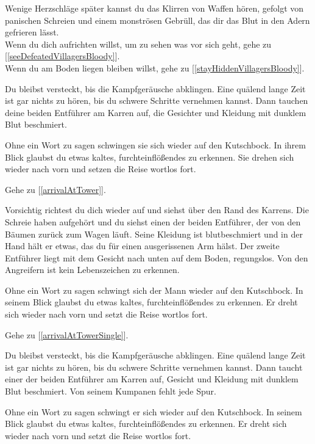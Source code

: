 Wenige Herzschläge später kannst du das Klirren von Waffen hören, gefolgt von panischen Schreien und einem monströsen Gebrüll, das dir das Blut in den Adern gefrieren lässt.
\\Wenn du dich aufrichten willst, um zu sehen was vor sich geht, gehe zu [\ref{seeDefeatedVillagersBloody}].
\\Wenn du am Boden liegen bleiben willst, gehe zu [\ref{stayHiddenVillagersBloody}].


Du bleibst versteckt, bis die Kampfgeräusche abklingen. Eine quälend lange Zeit ist gar nichts zu hören, bis du schwere Schritte vernehmen kannst. Dann tauchen deine beiden Entführer am Karren auf, die Gesichter und Kleidung mit dunklem Blut beschmiert.

Ohne ein Wort zu sagen schwingen sie sich wieder auf den Kutschbock. In ihrem Blick glaubst du etwas kaltes, furchteinflößendes zu erkennen. Sie drehen sich wieder nach vorn und setzen die Reise wortlos fort.

Gehe zu [\ref{arrivalAtTower}].


Vorsichtig richtest du dich wieder auf und siehst über den Rand des Karrens. Die Schreie haben aufgehört und du siehst einen der beiden Entführer, der von den Bäumen zurück zum Wagen läuft. Seine Kleidung ist blutbeschmiert und in der Hand hält er etwas, das du für einen ausgerissenen Arm hälst. Der zweite Entführer liegt mit dem Gesicht nach unten auf dem Boden, regungslos. Von den Angreifern ist kein Lebenszeichen zu erkennen.

Ohne ein Wort zu sagen schwingt sich der Mann wieder auf den Kutschbock. In seinem Blick glaubst du etwas kaltes, furchteinflößendes zu erkennen. Er dreht sich wieder nach vorn und setzt die Reise wortlos fort.

Gehe zu [\ref{arrivalAtTowerSingle}].


Du bleibst versteckt, bis die Kampfgeräusche abklingen. Eine quälend lange Zeit ist gar nichts zu hören, bis du schwere Schritte vernehmen kannst. Dann taucht einer der beiden Entführer am Karren auf, Gesicht und Kleidung mit dunklem Blut beschmiert. Von seinem Kumpanen fehlt jede Spur.

Ohne ein Wort zu sagen schwingt er sich wieder auf den Kutschbock. In seinem Blick glaubst du etwas kaltes, furchteinflößendes zu erkennen. Er dreht sich wieder nach vorn und setzt die Reise wortlos fort.

